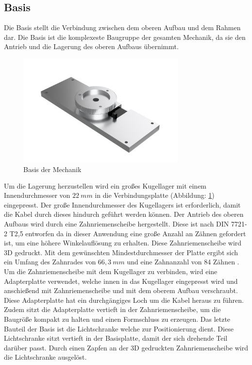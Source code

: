 \subsection{Basis}
Die Basis stellt die Verbindung zwischen dem oberen Aufbau und dem Rahmen dar. Die Basis ist die komplexeste Baugruppe der gesamten Mechanik, da sie den Antrieb und die Lagerung des oberen Aufbaus übernimmt. 
\begin{figure}[H]
	\centering
	\includegraphics[width=0.75\textwidth]{images/Mechanik/Basis}
	\caption{Basis der Mechanik}
	\label{basis}
\end{figure}
Um die Lagerung herzustellen wird ein großes Kugellager mit einem Innendurchmesser von $22\:mm$ in die Verbindungsplatte (Abbildung: \ref{basis}) eingepresst. Der große Innendurchmesser des Kugellagers ist erforderlich, damit die Kabel durch dieses hindurch geführt werden können. Der Antrieb des oberen Aufbaus wird durch eine Zahnriemenscheibe hergestellt. Diese ist nach DIN 7721-2 T2,5 \cite{Tabellenbuch} entworfen da in dieser Anwendung eine große Anzahl an Zähnen gefordert ist, um eine höhere Winkelauflösung zu erhalten. Diese Zahnriemenscheibe wird 3D gedruckt. Mit dem gewünschten Mindestdurchmesser der Platte ergibt sich ein Umfang des Zahnrades von $66,3\:mm$ und eine Zahnanzahl von 84 Zähnen \cite{Tabellenbuch}. Um die Zahnriemenscheibe mit dem Kugellager zu verbinden, wird eine Adapterplatte verwendet, welche innen in das Kugellager eingepresst wird und anschießend mit Zahnriemenscheibe und mit dem oberem Aufbau verschraubt. Diese Adapterplatte hat ein durchgängiges Loch um die Kabel heraus zu führen. Zudem sitzt die Adapterplatte vertieft in der Zahnriemenscheibe, um die Baugröße kompakt zu halten und einen Formschluss zu erzeugen. Das letzte Bauteil der Basis ist die Lichtschranke welche zur Positionierung dient. Diese Lichtschranke sitzt vertieft in der Basisplatte, damit der sich drehende Teil darüber passt. Durch einen Zapfen an der 3D gedruckten Zahnriemenscheibe wird die Lichtschranke ausgelöst. 
